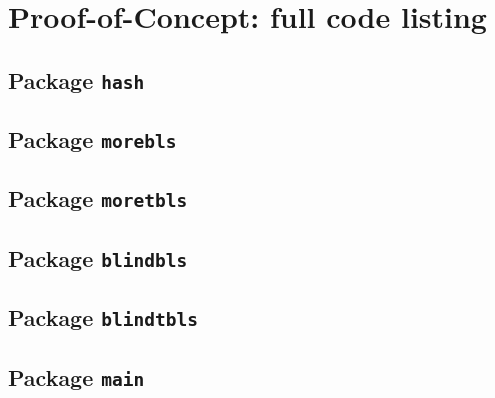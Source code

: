 \chapter{Proof-of-Concept: full code listing}
\label{app:code}

\lstset{captionpos=t}

\newcommand{\ImportGo}[1]{\vspace{2cm}}
\newcommand{\ImportGoTest}[1]{\vspace{2cm}}
\newcommand{\ImportGoWithTest}[1]{\vspace{2cm} \vspace{2cm}}

\section{Package \texttt{hash}}
\ImportGoWithTest{hash/hashing}

\section{Package \texttt{morebls}}
\ImportGoWithTest{morebls/morebls}


\section{Package \texttt{moretbls}}
\ImportGoWithTest{moretbls/moretbls}

\section{Package \texttt{blindbls}}
\ImportGoWithTest{blindbls/blindbls}

\section{Package \texttt{blindtbls}}
\label{app:blindtbls}
\ImportGoWithTest{blindtbls/adapter}
\ImportGoWithTest{blindtbls/blindtbls}



\section{Package \texttt{main}}
\vspace{2cm}
\ImportGoWithTest{main}
\ImportGo{user}
\ImportGo{server}
\ImportGoWithTest{crypto}
\ImportGoWithTest{hashing}
\ImportGo{ipfs}